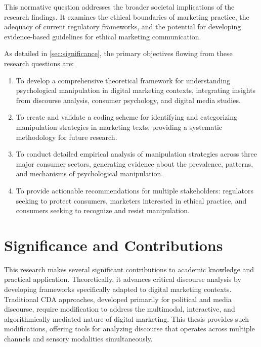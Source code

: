 This normative question addresses the broader societal implications of the research findings. It examines the ethical boundaries of marketing practice, the adequacy of current regulatory frameworks, and the potential for developing evidence-based guidelines for ethical marketing communication.

As detailed in \autoref{sec:significance}, the primary objectives flowing from these research questions are:

\begin{enumerate}
\item To develop a comprehensive theoretical framework for understanding psychological manipulation in digital marketing contexts, integrating insights from discourse analysis, consumer psychology, and digital media studies.

\item To create and validate a coding scheme for identifying and categorizing manipulation strategies in marketing texts, providing a systematic methodology for future research.

\item To conduct detailed empirical analysis of manipulation strategies across three major consumer sectors, generating evidence about the prevalence, patterns, and mechanisms of psychological manipulation.

\item To provide actionable recommendations for multiple stakeholders: regulators seeking to protect consumers, marketers interested in ethical practice, and consumers seeking to recognize and resist manipulation.
\end{enumerate}

\section{Significance and Contributions}
\label{sec:significance}

This research makes several significant contributions to academic knowledge and practical application. Theoretically, it advances critical discourse analysis by developing frameworks specifically adapted to digital marketing contexts. Traditional CDA approaches, developed primarily for political and media discourse, require modification to address the multimodal, interactive, and algorithmically mediated nature of digital marketing. This thesis provides such modifications, offering tools for analyzing discourse that operates across multiple channels and sensory modalities simultaneously.

